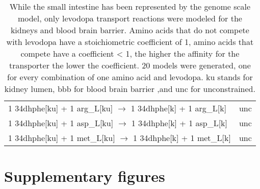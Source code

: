 \begin{table}[h]
\begin{center}
\begin{tabularx}{\textwidth}{L{12cm}L{2.5cm}}
	1 34dhphe[ku] + 1 arg\_L[ku] $\rightarrow$ 1 34dhphe[k] + 1 arg\_L[k] &  unc \\
	1 34dhphe[ku] + 1 asp\_L[ku] $\rightarrow$ 1 34dhphe[k] + 1 asp\_L[k] &  unc \\
	1 34dhphe[ku] + 1 met\_L[ku] $\rightarrow$ 1 34dhphe[k] + 1 met\_L[k] &  unc \\
	\hline
	\end{tabularx}
\end{center}
\caption*{While the small intestine has been represented by the genome scale model, only levodopa transport reactions were modeled for the kidneys and blood brain barrier. Amino acids that do not compete with levodopa have a stoichiometric coefficient of 1, amino acids that compete have a coefficient < 1, the higher the affinity for the transporter the lower the coefficient. 20 models were generated, one for every combination of one amino acid and levodopa. ku stands for kidney lumen, bbb for blood brain barrier ,and unc for unconstrained.}
\label{tbl:tbls31}%
\end{table}

\clearpage
\section{Supplementary figures}
